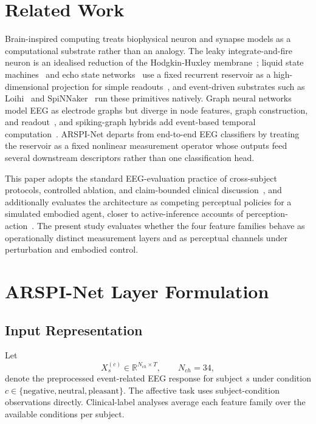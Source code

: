 \documentclass[journal]{IEEEtran}
\begin{document}
\section{Related Work}
Brain-inspired computing treats biophysical neuron and synapse models as a computational substrate rather than an analogy. The leaky integrate-and-fire neuron is an idealised reduction of the Hodgkin-Huxley membrane~\cite{hodgkin1952quantitative}; liquid state machines~\cite{maass2002liquid} and echo state networks~\cite{jaeger2001echo} use a fixed recurrent reservoir as a high-dimensional projection for simple readouts~\cite{lukosevicius2009reservoir}, and event-driven substrates such as Loihi~\cite{davies2018loihi} and SpiNNaker~\cite{furber2014spinnaker} run these primitives natively. Graph neural networks model EEG as electrode graphs but diverge in node features, graph construction, and readout~\cite{klepl2024gnn}, and spiking-graph hybrids add event-based temporal computation~\cite{gong2023sglnet}. ARSPI-Net departs from end-to-end EEG classifiers by treating the reservoir as a fixed nonlinear measurement operator whose outputs feed several downstream descriptors rather than one classification head.

This paper adopts the standard EEG-evaluation practice of cross-subject protocols, controlled ablation, and claim-bounded clinical discussion~\cite{lawhern2018eegnet,craik2019deep,gong2023sglnet,guo2025mma}, and additionally evaluates the architecture as competing perceptual policies for a simulated embodied agent, closer to active-inference accounts of perception-action~\cite{friston2010free,parr2022activeinference,pezzulo2015active}. The present study evaluates whether the four feature families behave as operationally distinct measurement layers and as perceptual channels under perturbation and embodied control.

\section{ARSPI-Net Layer Formulation}
\subsection{Input Representation}
Let
\begin{equation}
X_s^{(c)} \in \mathbb{R}^{N_{ch}\times T}, \qquad N_{ch}=34,
\end{equation}
denote the preprocessed event-related EEG response for subject $s$ under condition $c\in\{\mathrm{negative},\mathrm{neutral},\mathrm{pleasant}\}$. The affective task uses subject-condition observations directly. Clinical-label analyses average each feature family over the available conditions per subject.
\end{document}
